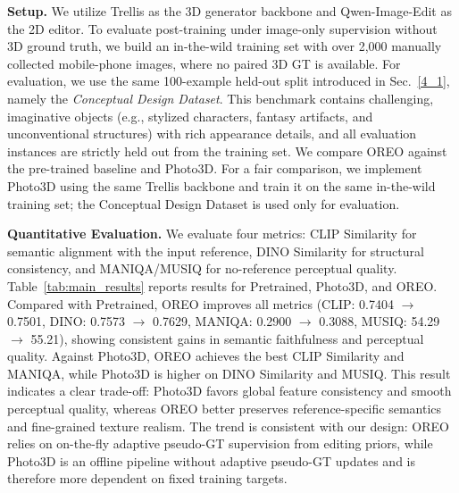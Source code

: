 \documentclass[runningheads]{llncs}
\begin{document}
\textbf{Setup.}
We utilize Trellis as the 3D generator backbone and Qwen-Image-Edit as the 2D editor.
To evaluate post-training under image-only supervision without 3D ground truth, we build an in-the-wild training set with over 2,000 manually collected mobile-phone images, where no paired 3D GT is available.
For evaluation, we use the same 100-example held-out split introduced in Sec.~\ref{4_1}, namely the \textit{Conceptual Design Dataset}.
This benchmark contains challenging, imaginative objects (e.g., stylized characters, fantasy artifacts, and unconventional structures) with rich appearance details, and all evaluation instances are strictly held out from the training set.
We compare OREO against the pre-trained baseline and Photo3D. For a fair comparison, we implement Photo3D using the same Trellis backbone and train it on the same in-the-wild training set; the Conceptual Design Dataset is used only for evaluation.

\textbf{Quantitative Evaluation.}
We evaluate four metrics: CLIP Similarity for semantic alignment with the input reference, DINO Similarity for structural consistency, and MANIQA/MUSIQ for no-reference perceptual quality.
Table~\ref{tab:main_results} reports results for Pretrained, Photo3D, and OREO.
Compared with Pretrained, OREO improves all metrics (CLIP: 0.7404 $\rightarrow$ 0.7501, DINO: 0.7573 $\rightarrow$ 0.7629, MANIQA: 0.2900 $\rightarrow$ 0.3088, MUSIQ: 54.29 $\rightarrow$ 55.21), showing consistent gains in semantic faithfulness and perceptual quality.
Against Photo3D, OREO achieves the best CLIP Similarity and MANIQA, while Photo3D is higher on DINO Similarity and MUSIQ.
This result indicates a clear trade-off: Photo3D favors global feature consistency and smooth perceptual quality, whereas OREO better preserves reference-specific semantics and fine-grained texture realism.
The trend is consistent with our design: OREO relies on on-the-fly adaptive pseudo-GT supervision from editing priors, while Photo3D is an offline pipeline without adaptive pseudo-GT updates and is therefore more dependent on fixed training targets.
\end{document}
